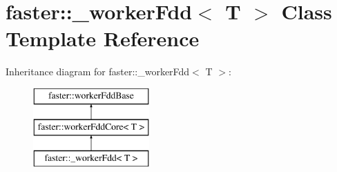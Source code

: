 \hypertarget{classfaster_1_1__workerFdd}{}\section{faster\+:\+:\+\_\+worker\+Fdd$<$ T $>$ Class Template Reference}
\label{classfaster_1_1__workerFdd}
Inheritance diagram for faster\+:\+:\+\_\+worker\+Fdd$<$ T $>$\+:\begin{figure}[H]
\begin{center}
\leavevmode
\includegraphics[height=3.000000cm]{classfaster_1_1__workerFdd}
\end{center}
\end{figure}
